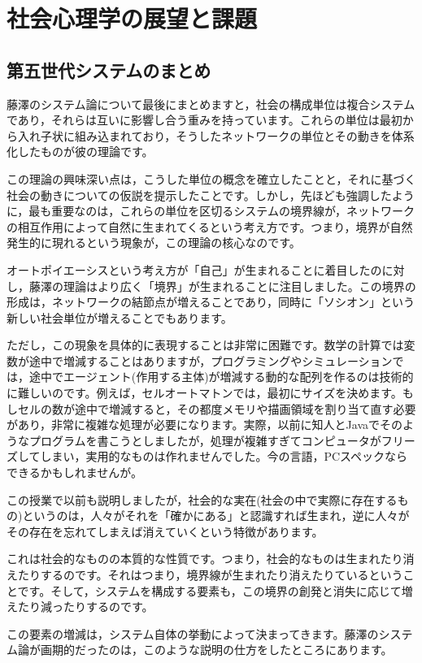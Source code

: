 \documentclass{ltjsbook}
\begin{document}
\section{社会心理学の展望と課題}
\subsection{第五世代システムのまとめ}
藤澤のシステム論について最後にまとめますと，社会の構成単位は複合システムであり，それらは互いに影響し合う重みを持っています。これらの単位は最初から入れ子状に組み込まれており，そうしたネットワークの単位とその動きを体系化したものが彼の理論です。

この理論の興味深い点は，こうした単位の概念を確立したことと，それに基づく社会の動きについての仮説を提示したことです。しかし，先ほども強調したように，最も重要なのは，これらの単位を区切るシステムの境界線が，ネットワークの相互作用によって自然に生まれてくるという考え方です。つまり，境界が自然発生的に現れるという現象が，この理論の核心なのです。

オートポイエーシスという考え方が「自己」が生まれることに着目したのに対し，藤澤の理論はより広く「境界」が生まれることに注目しました。この境界の形成は，ネットワークの結節点が増えることであり，同時に「ソシオン」という新しい社会単位が増えることでもあります。

ただし，この現象を具体的に表現することは非常に困難です。数学の計算では変数が途中で増減することはありますが，プログラミングやシミュレーションでは，途中でエージェント(作用する主体)が増減する動的な配列を作るのは技術的に難しいのです。例えば，セルオートマトンでは，最初にサイズを決めます。もしセルの数が途中で増減すると，その都度メモリや描画領域を割り当て直す必要があり，非常に複雑な処理が必要になります。実際，以前に知人とJavaでそのようなプログラムを書こうとしましたが，処理が複雑すぎてコンピュータがフリーズしてしまい，実用的なものは作れませんでした。今の言語，PCスペックならできるかもしれませんが。

この授業で以前も説明しましたが，社会的な実在(社会の中で実際に存在するもの)というのは，人々がそれを「確かにある」と認識すれば生まれ，逆に人々がその存在を忘れてしまえば消えていくという特徴があります。

これは社会的なものの本質的な性質です。つまり，社会的なものは生まれたり消えたりするのです。それはつまり，境界線が生まれたり消えたりているということです。そして，システムを構成する要素も，この境界の創発と消失に応じて増えたり減ったりするのです。

この要素の増減は，システム自体の挙動によって決まってきます。藤澤のシステム論が画期的だったのは，このような説明の仕方をしたところにあります。
\end{document}
